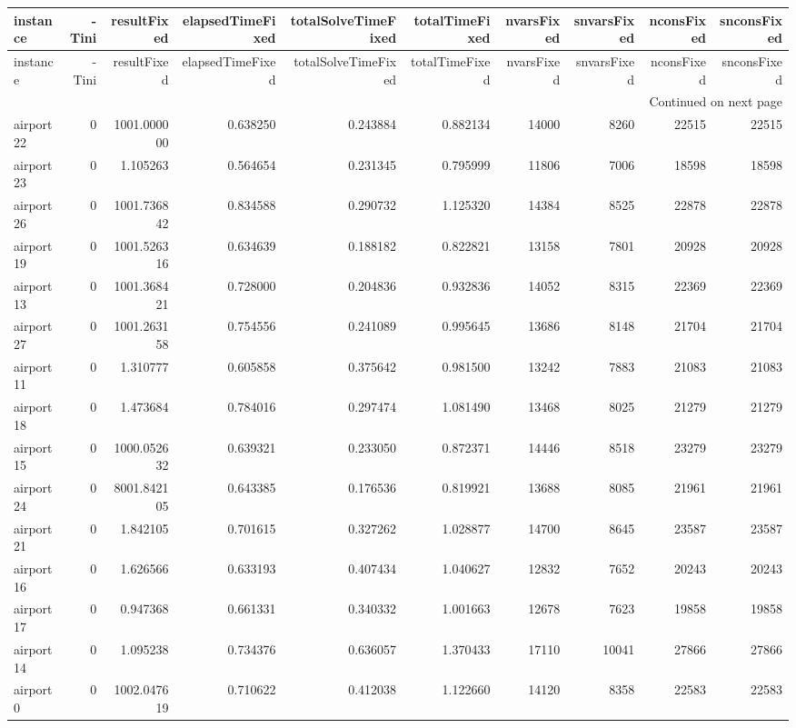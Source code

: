 \begin{longtable}{|l|r|r|r|r|r|r|r|r|r|}
\toprule
instance & -Tini & resultFixed & elapsedTimeFixed & totalSolveTimeFixed & totalTimeFixed & nvarsFixed & snvarsFixed & nconsFixed & snconsFixed \\
\midrule
\endfirsthead
\toprule
instance & -Tini & resultFixed & elapsedTimeFixed & totalSolveTimeFixed & totalTimeFixed & nvarsFixed & snvarsFixed & nconsFixed & snconsFixed \\
\midrule
\endhead
\midrule
\multicolumn{10}{r}{Continued on next page} \\
\midrule
\endfoot
\bottomrule
\endlastfoot
airport22 & 0 & 1001.000000 & 0.638250 & 0.243884 & 0.882134 & 14000 & 8260 & 22515 & 22515 \\
airport23 & 0 & 1.105263 & 0.564654 & 0.231345 & 0.795999 & 11806 & 7006 & 18598 & 18598 \\
airport26 & 0 & 1001.736842 & 0.834588 & 0.290732 & 1.125320 & 14384 & 8525 & 22878 & 22878 \\
airport19 & 0 & 1001.526316 & 0.634639 & 0.188182 & 0.822821 & 13158 & 7801 & 20928 & 20928 \\
airport13 & 0 & 1001.368421 & 0.728000 & 0.204836 & 0.932836 & 14052 & 8315 & 22369 & 22369 \\
airport27 & 0 & 1001.263158 & 0.754556 & 0.241089 & 0.995645 & 13686 & 8148 & 21704 & 21704 \\
airport11 & 0 & 1.310777 & 0.605858 & 0.375642 & 0.981500 & 13242 & 7883 & 21083 & 21083 \\
airport18 & 0 & 1.473684 & 0.784016 & 0.297474 & 1.081490 & 13468 & 8025 & 21279 & 21279 \\
airport15 & 0 & 1000.052632 & 0.639321 & 0.233050 & 0.872371 & 14446 & 8518 & 23279 & 23279 \\
airport24 & 0 & 8001.842105 & 0.643385 & 0.176536 & 0.819921 & 13688 & 8085 & 21961 & 21961 \\
airport21 & 0 & 1.842105 & 0.701615 & 0.327262 & 1.028877 & 14700 & 8645 & 23587 & 23587 \\
airport16 & 0 & 1.626566 & 0.633193 & 0.407434 & 1.040627 & 12832 & 7652 & 20243 & 20243 \\
airport17 & 0 & 0.947368 & 0.661331 & 0.340332 & 1.001663 & 12678 & 7623 & 19858 & 19858 \\
airport14 & 0 & 1.095238 & 0.734376 & 0.636057 & 1.370433 & 17110 & 10041 & 27866 & 27866 \\
airport0 & 0 & 1002.047619 & 0.710622 & 0.412038 & 1.122660 & 14120 & 8358 & 22583 & 22583 \\

\end{longtable}
